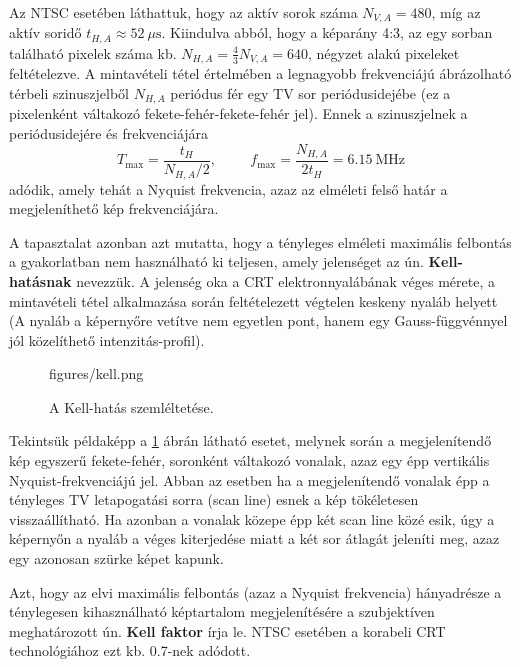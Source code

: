 Az NTSC esetében láthattuk, hogy az aktív sorok száma $N_{V,A} = 480$, míg az aktív soridő $t_{H,A} \approx 52~\mu \mathrm{s}$.
Kiindulva abból, hogy a képarány 4:3, az egy sorban található pixelek száma kb. $N_{H,A} = \frac{4}{3} N_{V,A} = 640$, négyzet alakú pixeleket feltételezve.
A mintavételi tétel értelmében a legnagyobb frekvenciájú ábrázolható térbeli szinuszjelből $N_{H,A}$ periódus fér egy TV sor periódusidejébe (ez a pixelenként váltakozó fekete-fehér-fekete-fehér jel).
Ennek a szinuszjelnek a periódusidejére és frekvenciájára
\begin{equation}
T_{\mathrm{max}} = \frac{t_H}{N_{H,A}/2}, \hspace{1cm} f_{\mathrm{max}} = \frac{N_{H,A}}{2 t_H} = 6.15~\mathrm{MHz}
\end{equation}
adódik, amely tehát a Nyquist frekvencia, azaz az elméleti felső határ a megjeleníthető kép frekvenciájára.

A tapasztalat azonban azt mutatta, hogy a tényleges elméleti maximális felbontás a gyakorlatban nem használható ki teljesen, amely jelenséget az ún. \textbf{Kell-hatásnak} nevezzük.
A jelenség oka a CRT elektronnyalábának véges mérete, a mintavételi tétel alkalmazása során feltételezett végtelen keskeny nyaláb helyett (A nyaláb a képernyőre vetítve nem egyetlen pont, hanem egy Gauss-függvénnyel jól közelíthető intenzitás-profil).
\begin{figure}[]
	\centering
	\begin{minipage}[c]{0.65\textwidth}
	\begin{overpic}[width = 0.95\columnwidth ]{figures/kell.png}
	\end{overpic} \end{minipage}\hfill
	\begin{minipage}[c]{0.35\textwidth}	\caption{A Kell-hatás szemléltetése.}
	\label{Fig:Kell}  \end{minipage}
\end{figure}
Tekintsük példaképp a \ref{Fig:Kell} ábrán látható esetet, melynek során a megjelenítendő kép egyszerű fekete-fehér, soronként váltakozó vonalak, azaz egy épp vertikális Nyquist-frekvenciájú jel.
Abban az esetben ha a megjelenítendő vonalak épp a tényleges TV letapogatási sorra (scan line) esnek a kép tökéletesen visszaállítható.
Ha azonban a vonalak közepe épp két scan line közé esik, úgy a képernyőn a nyaláb a véges kiterjedése miatt a két sor átlagát jeleníti meg, azaz egy azonosan szürke képet kapunk.

Azt, hogy az elvi maximális felbontás (azaz a Nyquist frekvencia) hányadrésze a ténylegesen kihasználható képtartalom megjelenítésére a szubjektíven meghatározott ún. \textbf{Kell faktor} írja le.
NTSC esetében a korabeli CRT technológiához ezt kb. 0.7-nek adódott.

